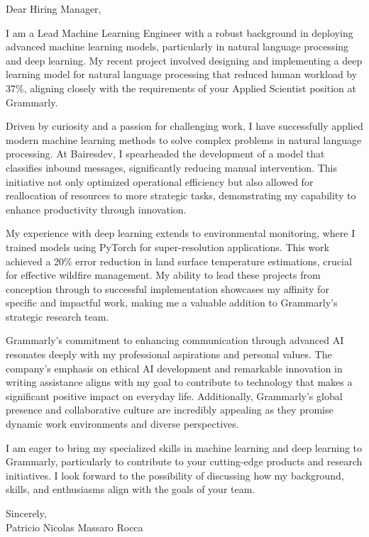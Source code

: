 \documentclass{article}
\begin{document}
\noindent Dear Hiring Manager,


I am a Lead Machine Learning Engineer with a robust background in deploying advanced machine learning models, particularly in natural language processing and deep learning. My recent project involved designing and implementing a deep learning model for natural language processing that reduced human workload by 37\%, aligning closely with the requirements of your Applied Scientist position at Grammarly.


Driven by curiosity and a passion for challenging work, I have successfully applied modern machine learning methods to solve complex problems in natural language processing. At Bairesdev, I spearheaded the development of a model that classifies inbound messages, significantly reducing manual intervention. This initiative not only optimized operational efficiency but also allowed for reallocation of resources to more strategic tasks, demonstrating my capability to enhance productivity through innovation.


My experience with deep learning extends to environmental monitoring, where I trained models using PyTorch for super-resolution applications. This work achieved a 20\% error reduction in land surface temperature estimations, crucial for effective wildfire management. My ability to lead these projects from conception through to successful implementation showcases my affinity for specific and impactful work, making me a valuable addition to Grammarly’s strategic research team.


Grammarly’s commitment to enhancing communication through advanced AI resonates deeply with my professional aspirations and personal values. The company’s emphasis on ethical AI development and remarkable innovation in writing assistance aligns with my goal to contribute to technology that makes a significant positive impact on everyday life. Additionally, Grammarly’s global presence and collaborative culture are incredibly appealing as they promise dynamic work environments and diverse perspectives.


I am eager to bring my specialized skills in machine learning and deep learning to Grammarly, particularly to contribute to your cutting-edge products and research initiatives. I look forward to the possibility of discussing how my background, skills, and enthusiasms align with the goals of your team.

\vspace{1cm}
\setlength{\parskip}{0em}
\begin{flushright}
Sincerely,\\
Patricio Nicolas Massaro Rocca
\end{flushright}
\end{document}
